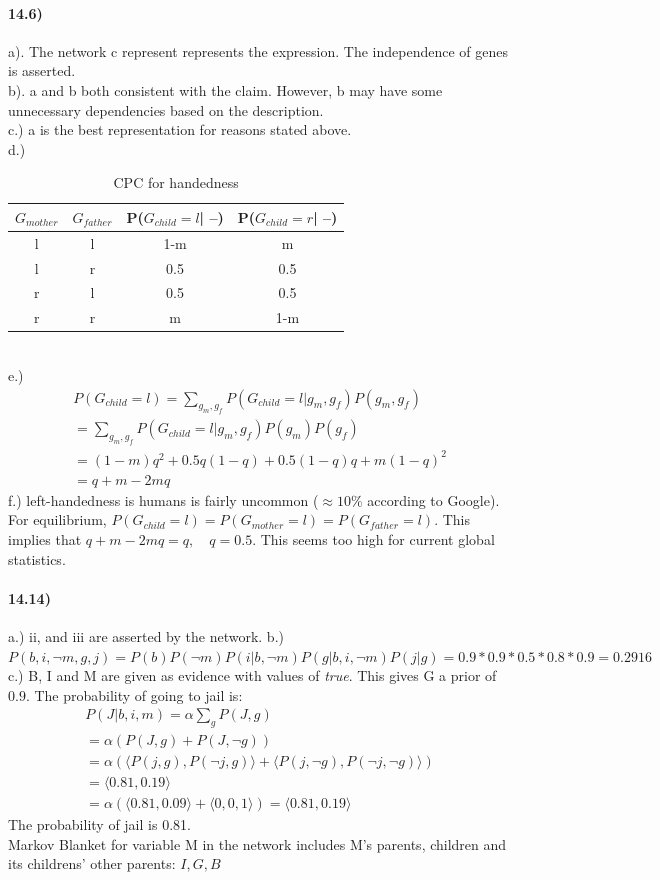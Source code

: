 \documentclass[12pt]{article}
\begin{document}
\paragraph{14.6)}
a). The network c represent represents the expression. The independence of genes is asserted.\\
b). a and b both consistent with the claim. However, b may have some unnecessary dependencies based on the description.\\
c.) a is the best representation for reasons stated above.\\
d.) 
\begin{table}[h]
\begin{center}
\caption{CPC for handedness} \label{tab:title} 
\begin{tabular}{|c c|c c|} 
\hline
$G_{mother}$&$G_{father}$&P($G_{child} = l$| --)&P($G_{child} = r$| --)\\ [0.5ex] 
\hline
l & l&1-m&m\\
\hline
l & r&0.5&0.5\\
\hline
r & l&0.5&0.5\\ 
\hline
r&r&m&1-m\\[1ex]
\hline
\end{tabular}
\end{center}
\end{table}
\\
e.) 
\begin{align}
P(G_{child}=l) = \sum_{g_m,g_f} P(G_{child} = l|g_m,g_f)P(g_m,g_f)\\
= \sum_{g_m,g_f} P(G_{child} = l | g_m, g_f)P(g_m)P(g_f)\\
=(1-m)q^2 + 0.5q(1-q)+0.5(1-q)q+m(1-q)^2\\
=q+m-2mq
\end{align}
f.) left-handedness is humans is fairly uncommon ($\approx 10\%$ according to Google). For equilibrium, $P(G_{child} = l) = P(G_{mother}=l) = P(G_{father}=l)$. This implies that $q+m-2mq=q, \quad q = 0.5$. This seems too high for current global statistics.
\paragraph{14.14)}
a.) 
ii, and iii are asserted by the network.
b.)$P(b,i,\neg m,g,j)=P(b)P(\neg m)P(i|b,\neg m)P(g|b,i,\neg m)P(j|g) = 0.9 * 0.9 * 0.5 * 0.8 * 0.9 = 0.2916$\\
c.) B, I and M are given as evidence with values of \textit{true}. This gives G a prior of $0.9$. The probability of going to jail is:
\begin{align}
P(J|b,i,m) = \alpha \sum_g P(J,g) \\
= \alpha (P(J,g)+P(J,\neg g))\\
= \alpha (\langle P(j,g), P(\neg j,g) \rangle + \langle P(j,\neg g),P(\neg j, \neg g) \rangle ) \\
= \langle 0.81, 0.19 \rangle\\
=\alpha (\langle 0.81, 0.09 \rangle + \langle 0,0,1 \rangle ) = \langle 0.81, 0.19 \rangle
\end{align}
The probability of jail is 0.81.\\
Markov Blanket for variable M in the network includes M's parents, children and its childrens' other parents: ${I,G,B}$
\end{document}
